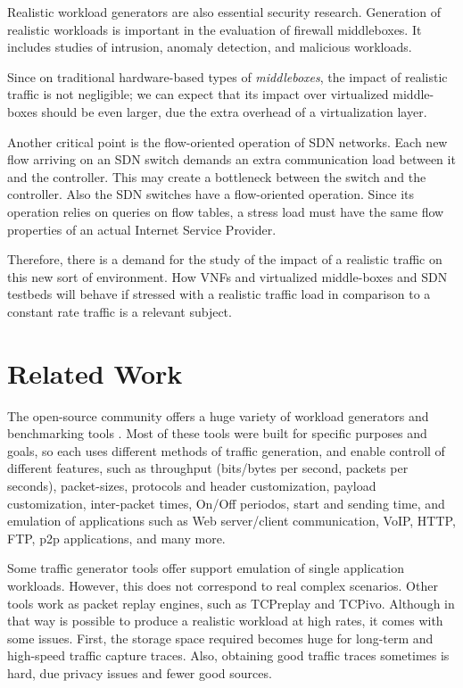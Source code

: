 Realistic workload generators are also essential security research\cite{ditg-paper}.  Generation of realistic workloads is important in the evaluation of firewall middleboxes. It includes studies of intrusion, anomaly detection, and malicious workloads\cite{ditg-paper}. 

Since on traditional hardware-based types of \textit{middleboxes}, the impact of realistic traffic is not negligible; we can expect that its impact over virtualized middle-boxes should be even larger, due the extra overhead of a virtualization layer. 


Another critical point is the flow-oriented operation of SDN networks. Each new flow arriving on an SDN switch demands an extra communication load between it and the controller. This may create a bottleneck between the switch and the controller.  Also the SDN switches have a flow-oriented operation. Since its operation relies on queries on flow tables, a stress load must have the same flow properties of an actual Internet Service Provider.


Therefore, there is a demand for the study of the impact of a realistic traffic on this new sort of environment. How VNFs and virtualized middle-boxes and SDN testbeds will behave if stressed with a realistic traffic load in comparison to a constant rate traffic is a relevant subject. 


\section{Related Work}


The open-source community offers a huge variety of workload generators and benchmarking tools \cite{ditg-paper}\cite{validate-trafficgen}\cite{comparative-trafficgen-tools}\cite{performance-trafficgen}. Most of these tools were built for specific purposes and goals, so each uses different methods of traffic generation, and enable controll of different features, such as throughput (bits/bytes per second, packets per seconds), packet-sizes, protocols and header customization, payload customization, inter-packet times, On/Off periodos, start and sending time, and emulation of applications such as Web server/client communication, VoIP, HTTP, FTP, p2p applications, and many more.


Some traffic generator tools offer support emulation of single application workloads. However, this does not correspond to real complex scenarios. Other tools work as packet replay engines, such as TCPreplay and TCPivo. Although in that way is possible to produce a realistic workload at high rates, it comes with some issues. First, the storage space required becomes huge for long-term and high-speed traffic capture traces. Also, obtaining good traffic traces sometimes is hard, due privacy issues and fewer good sources. 


